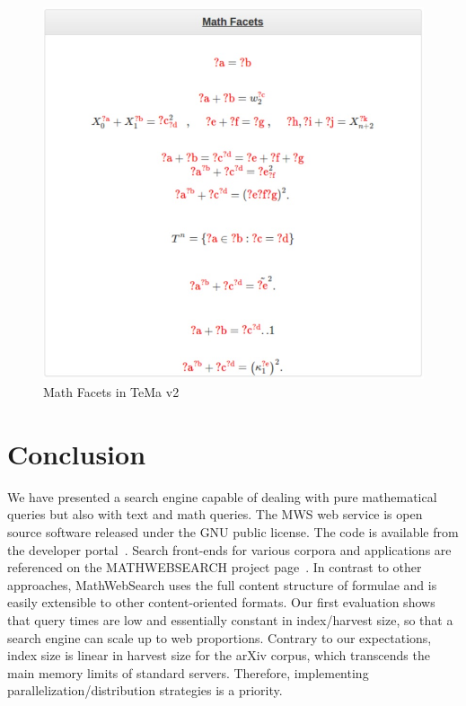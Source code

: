 \documentclass{deliverablereport}
\begin{document}
\begin{figure}[H]
\centering
 \includegraphics[scale=0.8]{figure10.jpg}
 \caption{Math Facets in TeMa v2}
\end{figure}

\section{Conclusion}\label{sec:concl}
We have presented a search engine capable of dealing with pure mathematical queries but
also with text and math queries. The MWS web service is open source software released
under the GNU public license. The code is available from the developer
portal~\cite{MWS-git:on}. Search front-ends for various corpora and applications are
referenced on the MATHWEBSEARCH project page~\cite{MWSProj:on}. In contrast to other
approaches, MathWebSearch uses the full content structure of formulae and is easily
extensible to other content-oriented formats. Our first evaluation shows that query times
are low and essentially constant in index/harvest size, so that a search engine can scale
up to web proportions. Contrary to our expectations, index size is linear in harvest size
for the arXiv corpus, which transcends the main memory limits of standard
servers. Therefore, implementing parallelization/distribution strategies is a
priority. 
\end{document}
